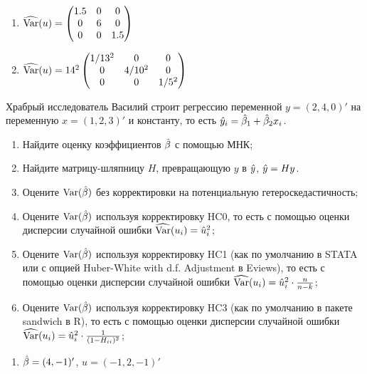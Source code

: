 \begin{problem}
\begin{sol}
\begin{enumerate}
    \item $\widehat{\operatorname{Var}}(u) = \begin{pmatrix}
      1.5 & 0 & 0 \\
      0 & 6 & 0 \\
      0 & 0 & 1.5 \\
    \end{pmatrix}$
    \item $\widehat{\operatorname{Var}}(u) = 14^2 \begin{pmatrix}
      1/13^2 & 0 & 0 \\
      0 & 4/10^2 & 0 \\
      0 & 0 & 1/5^2 \\
    \end{pmatrix}$
  \end{enumerate}
\end{sol}
\end{problem}


\begin{problem}
Храбрый исследователь Василий строит регрессию переменной $y=(2, 4, 0)'$ на переменную $x=(1, 2, 3)'$ и константу, то есть $\hat{y}_i = \hat{\beta}_1 + \hat{\beta}_2 x_i$.

\begin{enumerate}
  \item Найдите оценку коэффициентов $\hat{\beta}$ с помощью МНК;
  \item Найдите матрицу-шляпницу $H$, превращающую $y$ в $\hat{y}$, $\hat{y} = Hy$.
  \item Оцените $\operatorname{Var}(\hat{\beta})$ без корректировки на потенциальную гетероскедастичность;
  \item Оцените $\operatorname{Var}(\hat{\beta})$ используя корректировку HC0, то есть с помощью оценки дисперсии случайной ошибки $\widehat{\operatorname{Var}}(u_i)=\hat u_i^2$;
  \item Оцените $\operatorname{Var}(\hat{\beta})$ используя корректировку HC1 (как по умолчанию в STATA или с опцией Huber-White with d.f. Adjustment в Eviews), то есть с помощью оценки дисперсии случайной ошибки $\widehat{\operatorname{Var}}(u_i)=\hat u_i^2 \cdot \frac{n}{n-k}$;
  \item Оцените $\operatorname{Var}(\hat{\beta})$ используя корректировку HC3 (как по умолчанию в пакете sandwich в R), то есть с помощью оценки дисперсии случайной ошибки $\widehat{\operatorname{Var}}(u_i)=\hat u_i^2 \cdot \frac{1}{(1-H_{ii})^2}$;
\end{enumerate}
\begin{sol}
\begin{enumerate}
  \item $\hat{\beta} = (4, -1)'$, $\hat u = (-1, 2, -1)'$
\end{enumerate}

\end{sol}
\end{problem}


